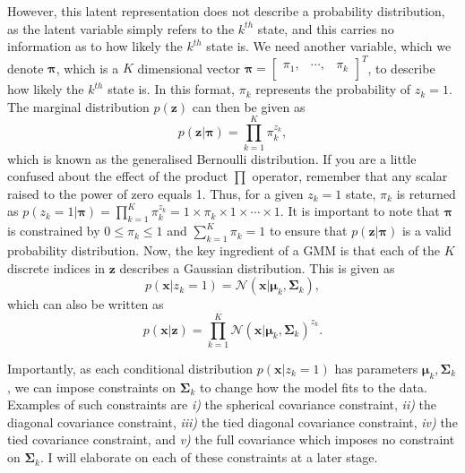 \documentclass{article}
\begin{document}
However, this latent representation does not describe a probability distribution, as the latent variable simply refers to the $k^{th}$ state, and this carries no information as to how likely the $k^{th}$ state is. We need another variable, which we denote $\boldsymbol\pi$, which is a $K$ dimensional vector $\boldsymbol\pi = \begin{bmatrix} \pi_1, & \cdots, & \pi_k \\ \end{bmatrix}^T$, to describe how likely the $k^{th}$ state is. In this format, $\pi_k$ represents the probability of $z_k = 1$. The marginal distribution $p(\mathbf{z})$ can then be given as
\begin{equation}
p(\mathbf{z}\vert \boldsymbol\pi) = \prod_{k=1}^K \pi_k^{z_k},
\end{equation}
which is known as the generalised Bernoulli distribution. If you are a little confused about the effect of the product $\prod$ operator, remember that any scalar raised to the power of zero equals 1. Thus, for a given $z_k = 1$ state, $\pi_k$ is returned as $p(z_k = 1\vert \boldsymbol\pi) = \prod_{k=1}^{K} \pi_k^{z_k} = 1 \times \pi_k \times 1 \times \cdots \times 1$. It is important to note that $\boldsymbol\pi$ is constrained by $0\leq \pi_k \leq 1$ and $\sum_{k=1}^K \pi_k = 1$ to ensure that $p(\mathbf{z}\vert \boldsymbol\pi)$ is a valid probability distribution. Now, the key ingredient of a GMM is that each of the $K$ discrete indices in $\mathbf{z}$ describes a Gaussian distribution. This is given as
\begin{equation}
p(\mathbf{x} \vert z_k = 1) = \mathcal{N}(\mathbf{x}\vert \boldsymbol\mu_k, \boldsymbol\Sigma_k),
\end{equation}
which can also be written as
\begin{equation}
p(\mathbf{x} \vert \mathbf{z}) = \prod_{k=1}^{K} \mathcal{N}(\mathbf{x}\vert \boldsymbol\mu_k, \boldsymbol\Sigma_k)^{z_k}.
\end{equation}

Importantly, as each conditional distribution $p(\mathbf{x} \vert z_k = 1)$ has parameters $\boldsymbol\mu_k, \boldsymbol\Sigma_k$, we can impose constraints on $\boldsymbol\Sigma_k$ to change how the model fits to the data. Examples of such constraints are \emph{i)} the spherical covariance constraint, \emph{ii)} the diagonal covariance constraint, \emph{iii)} the tied diagonal covariance constraint, \emph{iv)} the tied covariance constraint, and \emph{v)} the full covariance which imposes no constraint on $\boldsymbol\Sigma_k$. I will elaborate on each of these constraints at a later stage.
\end{document}

